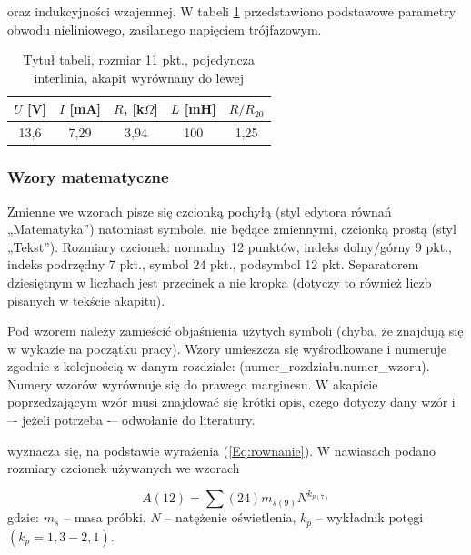 \documentclass[12pt,twoside]{mwart}
\begin{document}
\begin{example}
[\ldots] oraz indukcyjności wzajemnej. W tabeli \ref{Tab:tabela} przedstawiono podstawowe parametry obwodu nieliniowego, zasilanego napięciem trójfazowym.
\end{example}

\begin{table}[h]
\caption{Tytuł tabeli, rozmiar 11 pkt., pojedyncza interlinia, akapit wyrównany do lewej}
\centering		
	\begin{tabular}{|c|c|c|c|c|}	
		\hline
		$U$ [V] & $I$ [mA] & $R$, [k$\Omega$] & $L$ [mH] & $R/R_{20}$ \\
		\hline
		13,6 & 7,29 & 3,94 & 100 & 1,25 \\
		\hline
	\end{tabular}	
	
\label{Tab:tabela}
\end{table}	

{\subsubsection{Wzory matematyczne}}

Zmienne we wzorach pisze się czcionką pochyłą (styl edytora równań „Matematyka”) natomiast symbole, nie będące zmiennymi, czcionką prostą (styl „Tekst”).
Rozmiary czcionek: normalny 12 punktów, indeks dolny/górny 9 pkt., indeks podrzędny
7 pkt., symbol 24 pkt., podsymbol 12 pkt. Separatorem dziesiętnym w liczbach jest
przecinek a nie kropka (dotyczy to również liczb pisanych w tekście akapitu).


Pod wzorem należy zamieścić objaśnienia użytych symboli (chyba, że znajdują się
w wykazie na początku pracy). Wzory umieszcza się wyśrodkowane i numeruje zgodnie
z kolejnością w danym rozdziale: (numer\_rozdziału.numer\_wzoru). Numery wzorów
wyrównuje się do prawego marginesu. W akapicie poprzedzającym wzór musi znajdować się krótki opis, czego dotyczy dany wzór i –- jeżeli potrzeba -– odwołanie do literatury.

\begin{example}
[\ldots] wyznacza się, na podstawie wyrażenia (\ref{Eq:rownanie}). W nawiasach podano rozmiary czcionek używanych we wzorach
\end{example}

\begin{equation}
A(12)={\sum}(24)m_{s(9)}N^{k_{p(7)}}
\label{Eq:rownanie}
\end{equation}
gdzie: $m_s$ -- masa próbki, $N$ -- natężenie oświetlenia, $k_p$ -- wykładnik potęgi $(k_p=1,3-2,1)$.
\clearpage
\end{document}
